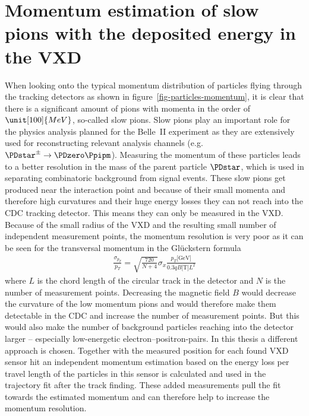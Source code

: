 \newcommand{\dedx}{$\mathrm d E / \mathrm d x$ }
\chapter{Momentum estimation of slow pions with the deposited energy in the VXD} \label{chapter-vxd}

When looking onto the typical momentum distribution of particles flying through the tracking detectors as shown in figure~\ref{fig-particles-momentum}, it is clear that there is a significant amount of pions with momenta in the order of $\unit[100]{MeV}$, so-called slow pions. Slow pions play an important role for the physics analysis planned for the Belle~II experiment as they are extensively used for reconstructing relevant analysis channels (e.g. $\PDstar^\pm \to \PDzero \Ppipm$). Measuring the momentum of these particles leads to a better resolution in the mass of the parent particle $\PDstar$, which is used in separating combinatoric background from signal events. These slow pions get produced near the interaction point and because of their small momenta and therefore high curvatures and their huge energy losses they can not reach into the CDC tracking detector. This means they can only be measured in the VXD. Because of the small radius of the VXD and the resulting small number of independent measurement points, the momentum resolution is very poor as it can be seen for the transversal momentum in the Glückstern formula
\begin{align*}
 \frac{\sigma_{p_T}}{p_T} = \sqrt{\frac{720}{N + 4}} \sigma_x \frac{p_T \text{[GeV]}}{0.3 q B \text{[T]} L^2}
\end{align*}
where $L$ is the chord length of the circular track in the detector and $N$ is the number of measurement points. Decreasing the magnetic field $B$ would decrease the curvature of the low momentum pions and would therefore make them detectable in the CDC and increase the number of measurement points. But this would also make the number of background particles reaching into the detector larger -- especially low-energetic electron--positron-pairs. In this thesis a different approach is chosen. Together with the measured position for each found VXD sensor hit an independent momentum estimation based on the energy loss per travel length of the particles in this sensor is calculated and used in the trajectory fit after the track finding. These added measurements pull the fit towards the estimated momentum and can therefore help to increase the momentum resolution.

